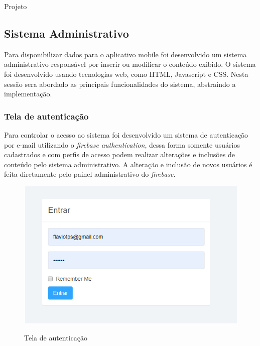 \documentclass[
	12pt,				%
	openright,			%
	twoside,			%
	a4paper,			%
	english,			%
	french,				%
	spanish,			%
	brazil				%
	]{abntex2}
\begin{document}
\begin{chapter}{Projeto}
\newpage
\subsection{Sistema Administrativo} \label{Sistema Administrativo}
Para disponibilizar dados para o aplicativo mobile foi desenvolvido um sistema administrativo responsável por inserir ou modificar o conteúdo exibido. O sistema foi desenvolvido usando tecnologias web, como HTML, Javascript e CSS. Nesta sessão sera abordado as principais funcionalidades do sistema, abstraindo a implementação.
\subsubsection{Tela de autenticação}
Para controlar o acesso ao sistema foi desenvolvido um sistema de autenticação por e-mail utilizando o \textit{firebase authentication}, dessa forma somente usuários cadastrados e com perfis de acesso podem realizar alterações e inclusões de conteúdo pelo sistema administrativo. 
A alteração e inclusão de novos usuários é feita diretamente pelo painel administrativo do \textit{firebase}.


\begin{figure}[h]
\centering
   \caption{Tela de autenticação}
   \includegraphics[scale=0.85]{media/tela_login_site_1.png}
     \label{fig:tela_login_site_1}
\end{figure}

\newpage

\end{chapter}
\end{document}
